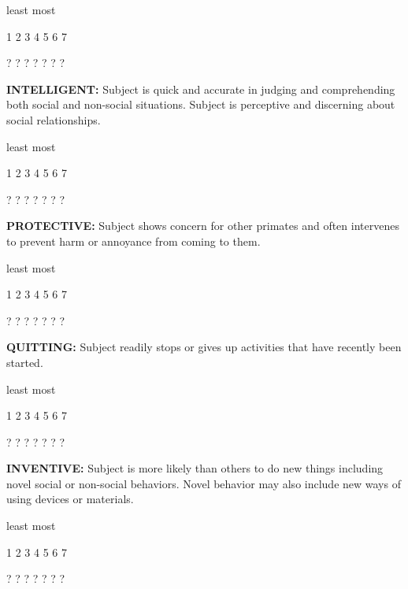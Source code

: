 \documentclass{article} %
\begin{document}
\noindent  

\noindent least                            most

  1    2    3    4    5    6    7   

  ?    ?    ?    ?    ?    ?    ?   

\noindent  

\textbf{   }

\noindent \textbf{INTELLIGENT:} Subject is quick and accurate in judging and comprehending both social and non-social situations. Subject is perceptive and discerning about social relationships. 

\noindent  

\noindent least                            most

  1    2    3    4    5    6    7   

  ?    ?    ?    ?    ?    ?    ?   

\noindent \textbf{ }

\noindent \textbf{PROTECTIVE:} Subject shows concern for other primates and often intervenes to prevent harm or annoyance from coming to them. 

\noindent  

\noindent least                            most

  1    2    3    4    5    6    7   

  ?    ?    ?    ?    ?    ?    ?   

\noindent \textbf{ }

\noindent \textbf{QUITTING:} Subject readily stops or gives up activities that have recently been started. 

\noindent  

\noindent least                            most

  1    2    3    4    5    6    7   

  ?    ?    ?    ?    ?    ?    ?   

\noindent \textbf{ }

\noindent \textbf{INVENTIVE:} Subject is more likely than others to do new things including novel social or non-social behaviors. Novel behavior may also include new ways of using devices or materials. 

\noindent \textbf{ }

\noindent least                            most

  1    2    3    4    5    6    7   

  ?    ?    ?    ?    ?    ?    ?   
\end{document}
